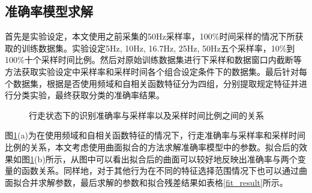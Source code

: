 \subsection{准确率模型求解}
\par 首先是实验设定，本文使用之前采集的50Hz采样率，100\%时间采样的情况下所获取的训练数据集。实验设定5Hz, 10Hz, 16.7Hz, 25Hz, 50Hz五个采样率，10\%到100\%十个采样时间比例。然后对原始训练数据集进行下采样和数据窗口内截断等方法获取实验设定中采样率和采样时间各个组合设定条件下的数据集。最后针对每个数据集，根据是否使用频域和自相关函数特征分为四组，分别提取规定特征并进行分类实验，最终获取分类的准确率结果。

\begin{figure}[!htb]
    \centering
    \caption{行走状态下的识别准确率与采样率以及采样时间比例之间的关系}\label{fit_precision}
\end{figure}

\par 图\ref{fit_precision}(a)为在使用频域和自相关函数特征的情况下，行走准确率与采样率和采样时间比例的关系，本文考虑使用曲面拟合的方法求解准确率模型中的参数。拟合后的效果如图\ref{fit_precision}(b)所示，从图中可以看出拟合后的曲面可以较好地反映出准确率与两个变量的函数关系。同样地，对于其他行为在不同的特征选择范围情况下也可以通过曲面拟合并求解参数，最后求解的参数和拟合残差结果如表格\ref{fit_result}所示。

